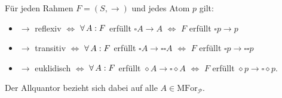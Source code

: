 \documentclass{cheat-sheet}
\newcommand{\MFor}{\mathrm{MFor}} %
\begin{document}
\begin{satz}
  Für jeden Rahmen $F = (S, \to)$ und jedes Atom $p$ gilt:
  \begin{itemize}
    \item $\to$ reflexiv $\Leftrightarrow$ $\forall \, {A\!} \,:\,\!F$ erfüllt $\square A \to A$ $\Leftrightarrow$ $F$ erfüllt $\square p \to p$
    \item $\to$ transitiv $\Leftrightarrow$ $\forall \, {A\!} \,:\,\!F$ erfüllt $\square A \to \square \square A$ $\Leftrightarrow$ $F$ erfüllt $\square p \to \square \square p$
    \item $\to$ euklidisch $\Leftrightarrow$ $\forall \, {A\!} \,:\,\!F$ erfüllt $\diamond A \to \square \diamond A$ $\Leftrightarrow$ $F$ erfüllt $\diamond p \to \square \diamond p$.
  \end{itemize}
  Der Allquantor bezieht sich dabei auf alle $A \in \MFor_{\mathcal{P}}$.
\end{satz}

\end{document}
